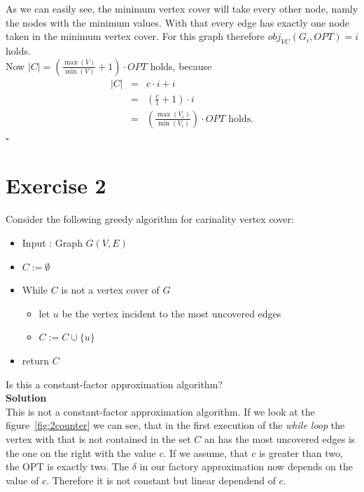 \documentclass[11pt,a4paper,ngerman]{article}
\begin{document}
\begin{description}
As we can easily see, the minimum vertex cover will take every other node, namly the nodes with the minimum values. With that every edge has exactly one node taken in the minimum vertex cover. For this graph therefore $obj_{VC}(G_i, OPT) = i$ holds.\\

Now $|C| = \left( \frac{\max (V)}{\min (V)} + 1 \right) \cdot OPT$ holds, because
$$
\begin{array}{rcl}
	|C|	&=& c \cdot i + i\\
		&=& \left( \frac{c}{1} + 1 \right) \cdot i\\
		&=& \left( \frac{\max (V_i) }{ \min (V_i) }\right) \cdot OPT \text{ holds.}
\end{array}
$$
\mbox{} \hfill $\square$
\end{description} 


\section*{Exercise 2}
Consider the following greedy algorithm for carinality vertex cover:
\begin{itemize}
	\item Input : Graph $G(V,E)$
	\item $C := \emptyset$
	\item While $C$ is not a vertex cover of $G$
		\begin{itemize}
			\item let $u$ be the vertex incident to the most uncovered edges
			\item $C := C \cup \{ u \}$
		\end{itemize}
	\item return $C$
\end{itemize}
Is this a constant-factor approximation algorithm?\\

\textbf{Solution}\\
This is not a constant-factor approximation algorithm. If we look at the figure~\ref{fig:2counter} we can see, that in the first execution of the \emph{while loop} the vertex with that is not contained in the set $C$ an has the most uncovered edges is the one on the right with the value $c$. If we assume, that $c$ is greater than two, the OPT is exactly two. The $\delta$ in our factory approximation now depends on the value of $c$. Therefore it is not constant but linear dependend of $c$.
\end{document}
